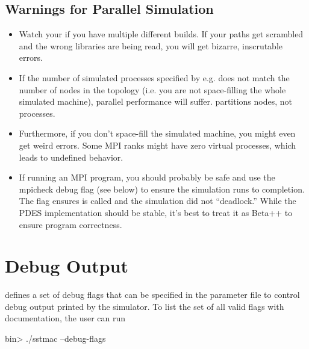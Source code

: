 \subsection{Warnings for Parallel Simulation}
\label{subsec:parallelwarn}
\begin{itemize}
\item Watch your  if you have multiple different builds. If your paths get scrambled and the wrong libraries are being read, you will get bizarre, inscrutable errors.
\item If the number of simulated processes specified by e.g.  does not match the number of nodes in the topology (i.e. you are not space-filling the whole simulated machine),
parallel performance will suffer. \sstmacro partitions nodes, not processes.
\item Furthermore, if you don't space-fill the simulated machine, you might even get weird errors. Some MPI ranks might have zero virtual processes, which leads to undefined behavior.
\item If running an MPI program,  you should probably be safe and use the mpicheck debug flag (see below) to ensure the simulation runs to completion.
The flag ensures  is called and the simulation did not ``deadlock.''
While the PDES implementation should be stable, it's best to treat it as Beta++ to ensure program correctness.
\end{itemize}


\section{Debug Output}
\label{sec:dbgoutput}
\sstmacro defines a set of debug flags that can be specified in the parameter file to control debug output printed by the simulator.
To list the set of all valid flags with documentation, the user can run

\begin{ShellCmd}
bin> ./sstmac --debug-flags
\end{ShellCmd}

